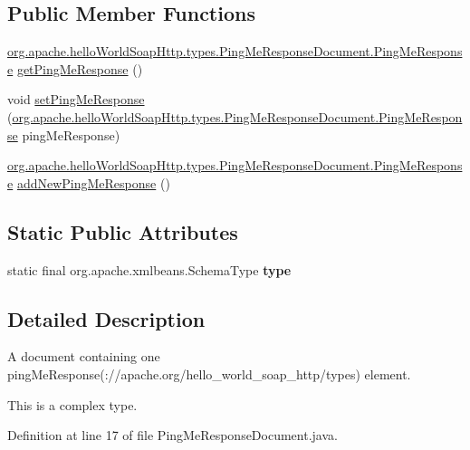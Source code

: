 \subsection*{Public Member Functions}
\begin{DoxyCompactItemize}
\item 
\hyperlink{interfaceorg_1_1apache_1_1hello_world_soap_http_1_1types_1_1_ping_me_response_document_1_1_ping_me_response}{org.\+apache.\+hello\+World\+Soap\+Http.\+types.\+Ping\+Me\+Response\+Document.\+Ping\+Me\+Response} \hyperlink{interfaceorg_1_1apache_1_1hello_world_soap_http_1_1types_1_1_ping_me_response_document_afdbab6443eb87e3cdc91718dfaaaa142}{get\+Ping\+Me\+Response} ()
\item 
void \hyperlink{interfaceorg_1_1apache_1_1hello_world_soap_http_1_1types_1_1_ping_me_response_document_a95664d120e97fbf7944c277b73b69c25}{set\+Ping\+Me\+Response} (\hyperlink{interfaceorg_1_1apache_1_1hello_world_soap_http_1_1types_1_1_ping_me_response_document_1_1_ping_me_response}{org.\+apache.\+hello\+World\+Soap\+Http.\+types.\+Ping\+Me\+Response\+Document.\+Ping\+Me\+Response} ping\+Me\+Response)
\item 
\hyperlink{interfaceorg_1_1apache_1_1hello_world_soap_http_1_1types_1_1_ping_me_response_document_1_1_ping_me_response}{org.\+apache.\+hello\+World\+Soap\+Http.\+types.\+Ping\+Me\+Response\+Document.\+Ping\+Me\+Response} \hyperlink{interfaceorg_1_1apache_1_1hello_world_soap_http_1_1types_1_1_ping_me_response_document_abae61a29d4d43fb23c9154aff2d716d7}{add\+New\+Ping\+Me\+Response} ()
\end{DoxyCompactItemize}
\subsection*{Static Public Attributes}
\begin{DoxyCompactItemize}
\item 
static final org.\+apache.\+xmlbeans.\+Schema\+Type {\bfseries type}
\end{DoxyCompactItemize}


\subsection{Detailed Description}
A document containing one ping\+Me\+Response(\+://apache.org/hello\+\_\+world\+\_\+soap\+\_\+http/types) element.

This is a complex type. 

Definition at line 17 of file Ping\+Me\+Response\+Document.\+java.




